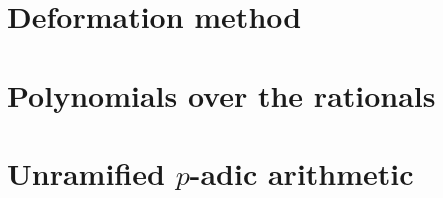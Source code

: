 
\chapter{Deformation method}


\chapter{Polynomials over the rationals}


\chapter{Unramified $p$-adic arithmetic}



